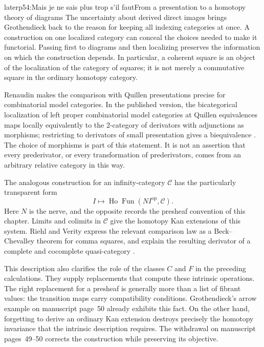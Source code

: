 \begin{dcomment}{later}{p54:Mais je ne sais plus trop s'il faut}{From a presentation to a homotopy theory of diagrams}
The uncertainty about derived direct images brings Grothendieck back to the
reason for keeping all indexing categories at once. A construction on one
localized category can conceal the choices needed to make it functorial.
Passing first to diagrams and then localizing preserves the information on
which the construction depends. In particular, a coherent square is an
object of the localization of the category of squares; it is not merely a
commutative square in the ordinary homotopy category.

Renaudin makes the comparison with Quillen presentations precise for
combinatorial model categories. In the published version, the bicategorical
localization of left proper combinatorial model categories at Quillen
equivalences maps locally equivalently to the 2-category of derivators with
adjunctions as morphisms; restricting to derivators of small presentation
gives a biequivalence \citep[Theorems~3.3.2 and~3.4.4]{Renaudin2009}.
The choice of morphisms is part of this statement. It is not an assertion
that every prederivator, or every transformation of prederivators, comes from
an arbitrary relative category in this way.

The analogous construction for an infinity-category $\mathcal C$ has the
particularly transparent form
\[
 I\longmapsto
 \operatorname{Ho}\operatorname{Fun}(NI^{\mathrm{op}},\mathcal C).
\]
Here $N$ is the nerve, and the opposite records the presheaf convention of
this chapter. Limits and colimits in $\mathcal C$ give the homotopy Kan
extensions of this system. Riehl and Verity express the relevant comparison
law as a Beck--Chevalley theorem for comma squares, and explain the resulting
derivator of a complete and cocomplete quasi-category
\citep[Proposition~5.3.9 and Remark~5.3.10]{RiehlVerity2017}.

This description also clarifies the role of the classes $C$ and $F$ in the
preceding calculations. They supply replacements that compute these
intrinsic operations. The right replacement for a presheaf is generally
more than a list of fibrant values: the transition maps carry compatibility
conditions. Grothendieck's arrow example on manuscript page~50 already
exhibits this fact. On the other hand, forgetting to derive an ordinary Kan
extension destroys precisely the homotopy invariance that the intrinsic
description requires. The withdrawal on manuscript pages~49--50 corrects
the construction while preserving its objective.
\end{dcomment}


